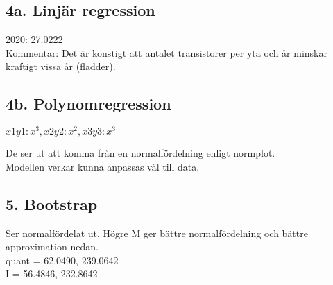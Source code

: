 \documentclass{article}
\begin{document}
\subsection*{4a. Linjär regression}
2020: 27.0222 \\
Kommentar: Det är konstigt att antalet transistorer per yta och år minskar
kraftigt vissa år (fladder).

\subsection*{4b. Polynomregression}
$x1y1: x^3, x2y2: x^2, x3y3: x^3$

De ser ut att komma från en normalfördelning enligt normplot. \\
Modellen verkar kunna anpassas väl till data.

\subsection*{5. Bootstrap}
Ser normalfördelat ut. Högre M ger bättre normalfördelning och bättre
approximation nedan.\\

quant = 62.0490, 239.0642 \\
I = 56.4846, 232.8642
\end{document}

